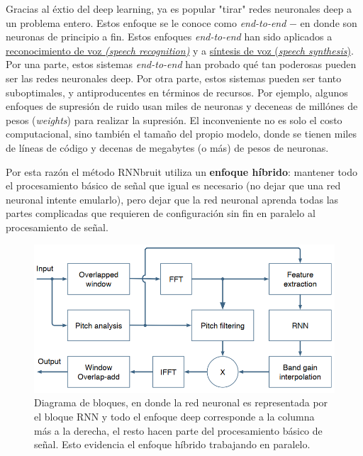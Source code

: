 \documentclass[conference,onecolumn]{IEEEtran}
\begin{document}
Gracias al éxtio del deep learning, ya es popular "tirar" redes neuronales deep a un problema entero. Estos enfoque se le conoce como \textit{end-to-end} $-$ en donde son neuronas de principio a fin. Estos enfoques \textit{end-to-end} han sido aplicados a \href{https://arxiv.org/pdf/1412.5567.pdf}{reconocimiento de voz \textit{(speech recognition)}} y a \href{https://deepmind.com/blog/article/wavenet-generative-model-raw-audio}{síntesis de voz (\textit{speech synthesis})}. Por una parte, estos sistemas \textit{end-to-end} han probado qué tan poderosas pueden ser las redes neuronales deep. Por otra parte, estos sistemas pueden ser tanto suboptimales, y antiproducentes en términos de recursos. Por ejemplo, algunos enfoques de supresión de ruido usan miles de neuronas y deceneas de millónes de pesos (\textit{weights}) para realizar la supresión. El inconveniente no es solo el costo computacional, sino también el tamaño del propio modelo, donde se tienen miles de líneas de código y decenas de megabytes (o más) de pesos de neuronas.


Por esta razón el método RNNbruit utiliza un \textbf{enfoque híbrido}: mantener todo el procesamiento básico de señal que igual es necesario (no dejar que una red neuronal intente emularlo), pero dejar que la red neuronal aprenda todas las partes complicadas que requieren de configuración sin fin en paralelo al procesamiento de señal.

 \begin{figure}[H]
 \centering
    \includegraphics[scale=0.7]{Block_Diagram.png}
    \caption{Diagrama de bloques, en donde la red neuronal es representada por el bloque RNN y todo el enfoque deep corresponde a la columna más a la derecha, el resto hacen parte del procesamiento básico de señal. Esto evidencia el enfoque híbrido trabajando en paralelo.}
    \label{Figure 16}
\end{figure}
\end{document}
